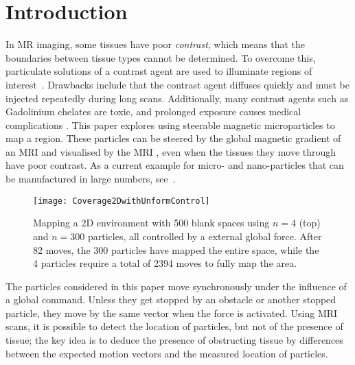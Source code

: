 \section{Introduction}\label{sec:Intro}
In MR imaging, some tissues have poor \emph{contrast}, which means that the boundaries between tissue types cannot be determined.
 To overcome this, particulate solutions of a contrast agent are used to illuminate regions of interest~\cite{na2009inorganic}. 
 Drawbacks include that the contrast agent diffuses quickly and must be injected repeatedly during long scans. 
 Additionally, many contrast agents such as Gadolinium chelates are toxic, and prolonged exposure causes medical complications \cite{caravan1999gadolinium}. 
This paper explores using steerable magnetic microparticles to map a region. 
These particles can be steered by the global magnetic gradient of an MRI and visualised by the MRI \cite{Vartholomeos2012}, even when the tissues they move through  have poor contrast.
As a current example for micro- and nano-particles that can be manufactured in large numbers, see~\cite{Chowdhury2015,martel2014computer,kim2015imparting,Donald2013,Ghosh2009,Ou2013,qiu2015magnetic}.

\begin{figure}
\begin{center}
	\texttt{[image: Coverage2DwithUnformControl]}
\end{center}
\caption{\label{fig:Coverage2DwithUnformControl}
Mapping a 2D environment with 500 blank spaces using $n=4$ (top) and $n=300$ particles, all controlled by a external global force.  After 82 moves, the 300 particles have mapped the entire space, while the 4 particles require a total of 2394 moves to fully map the area. 
}
\end{figure}

The particles considered in this paper move synchronously under the influence of a global command.
Unless they get stopped by an obstacle or another stopped particle, they move by the same vector when the force is activated. 
Using MRI scans, it is possible to detect the location of particles, but not of the presence of tissue;
the key idea is to deduce the presence of obstructing tissue by differences between the expected motion vectors and 
the measured location of particles.

